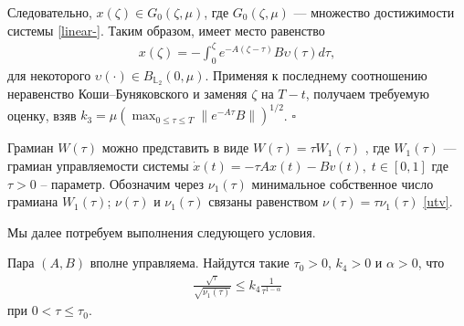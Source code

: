 \documentclass[../main.tex]{subfiles}
\begin{document}
	Следовательно, $x(\zeta) \in G_0(\zeta,\mu)$, где $G_0(\zeta,\mu)$ --- множество достижимости  системы  \eqref{linear-}. Таким образом, имеет место равенство
	 \begin{gather*}
		x(\zeta)=-\int_{0}^{\zeta}e^{-A(\zeta-\tau)}B\upsilon(\tau)d\tau,  
	 \end{gather*}
	 для некоторого $\upsilon(\cdot) \in B_{\mathbb{ L}_2}(0,\mu)$. Применяя к последнему соотношению неравенство Коши--Буняковского и заменяя $\zeta$ на $T-t$, получаем требуемую оценку, взяв $k_3=\mu (\max_{0\leqslant \tau \leqslant T}\|e^{-A\tau}B\|)^{1/2}$.
	\hfill $\square$
	
	Грамиан $W(\tau)$ можно представить в виде $W(\tau) = \tau W_1(\tau)$ , где $W_1(\tau)$ --- грамиан управляемости системы $ \dot{x}(t) = -\tau A x(t) - B v(t),\;  t \in [0, 1]$ где  $ \tau > 0 $ -- параметр. Обозначим через $\nu_1(\tau)$ минимальное собственное число грамиана $W_1(\tau)$; $\nu(\tau)$ и $\nu_1(\tau)$ связаны равенством  $\nu(\tau)=\tau \nu_1(\tau)$ \eqref{utv}.
	
	Мы далее потребуем выполнения следующего условия.
	\begin{cond}\label{condC}
		Пара $(A,B)$ вполне управляема. Найдутся такие $\tau_0>0$,  $ k_4 > 0$ и $\alpha > 0$, что
		\begin{gather}\label{gramas}
			\frac{\sqrt{\tau}}{\sqrt{\nu_1(\tau)}} \leqslant k_4 \frac{1}{\tau^{1-\alpha}}
		\end{gather}
		при $0<\tau \leqslant \tau_0$.
	\end{cond}
	
\end{document}
